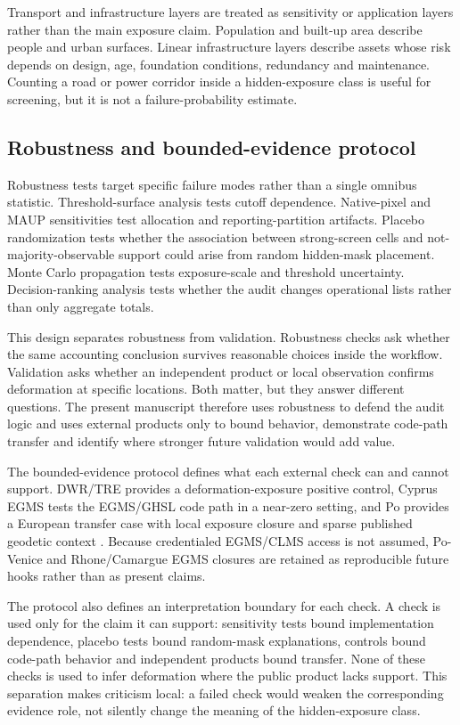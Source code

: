 \documentclass[pdflatex,sn-mathphys-ay]{sn-jnl}
\begin{document}
Transport and infrastructure layers are treated as sensitivity or application layers rather than the main exposure claim. Population and built-up area describe people and urban surfaces. Linear infrastructure layers describe assets whose risk depends on design, age, foundation conditions, redundancy and maintenance. Counting a road or power corridor inside a hidden-exposure class is useful for screening, but it is not a failure-probability estimate.

\subsection{Robustness and bounded-evidence protocol}

Robustness tests target specific failure modes rather than a single omnibus statistic. Threshold-surface analysis tests cutoff dependence. Native-pixel and MAUP sensitivities test allocation and reporting-partition artifacts. Placebo randomization tests whether the association between strong-screen cells and not-majority-observable support could arise from random hidden-mask placement. Monte Carlo propagation tests exposure-scale and threshold uncertainty. Decision-ranking analysis tests whether the audit changes operational lists rather than only aggregate totals.

This design separates robustness from validation. Robustness checks ask whether the same accounting conclusion survives reasonable choices inside the workflow. Validation asks whether an independent product or local observation confirms deformation at specific locations. Both matter, but they answer different questions. The present manuscript therefore uses robustness to defend the audit logic and uses external products only to bound behavior, demonstrate code-path transfer and identify where stronger future validation would add value.

The bounded-evidence protocol defines what each external check can and cannot support. DWR/TRE provides a deformation-exposure positive control, Cyprus EGMS tests the EGMS/GHSL code path in a near-zero setting, and Po provides a European transfer case with local exposure closure and sparse published geodetic context \citep{cenni2021po_delta_geodetic}. Because credentialed EGMS/CLMS access is not assumed, Po-Venice and Rhone/Camargue EGMS closures are retained as reproducible future hooks rather than as present claims.

The protocol also defines an interpretation boundary for each check. A check is used only for the claim it can support: sensitivity tests bound implementation dependence, placebo tests bound random-mask explanations, controls bound code-path behavior and independent products bound transfer. None of these checks is used to infer deformation where the public product lacks support. This separation makes criticism local: a failed check would weaken the corresponding evidence role, not silently change the meaning of the hidden-exposure class.
\end{document}

